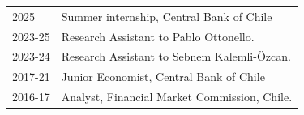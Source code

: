 
\begin{longtable}[l]{@{}p{} p{}}
    2025 & Summer internship, Central Bank of Chile \\
    2023-25 & Research Assistant to Pablo Ottonello. \\
    2023-24 & Research Assistant to Sebnem Kalemli-Özcan. \\
    2017-21 & Junior Economist, Central Bank of Chile \\ 
    2016-17 & Analyst, Financial Market Commission, Chile.

\end{longtable}